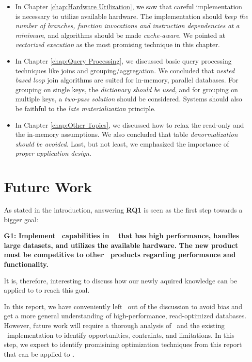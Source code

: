 \begin{itemize}
  \item In Chapter \ref{chap:Hardware Utilization}, we saw that careful implementation is necessary to utilize available hardware. The implementation should \textit{keep the number of branches, function invocations and instruction dependencies at a minimum}, and algorithms should be made \textit{cache-aware}. We pointed at \textit{vectorized execution} as the most promising technique in this chapter.

  \item In Chapter \ref{chap:Query Processing}, we discussed basic query processing techniques like joins and grouping/aggregation. We concluded that \textit{nested based loop} join algorithms are suited for in-memory, parallel databases. For grouping on single keys, the \textit{dictionary should be used}, and for grouping on multiple keys, a \textit{two-pass solution} should be considered. Systems should also be faithful to the \textit{late materialization} principle.

  \item In Chapter \ref{chap:Other Topics}, we discussed how to relax the read-only and the in-memory assumptions. We also concluded that table \textit{denormalization should be avoided}. Last, but not least, we emphasized the importance of \textit{proper application design}.
\end{itemize}


\section{Future Work}
\label{sec:Future Work}
As stated in the introduction, answering \textbf{RQ1} is seen as the first step towards a bigger goal:

\textbf{G1: Implement \bd~capabilities in \genusSoftware~ that has high performance, handles large datasets, and utilizes the available hardware. The new product must be competitive to other \bd~products regarding performance and functionality.}

It is, therefore, interesting to discuss how our newly aquired knowledge can be applied to to reach this goal.

In this report, we have conveniently left \genusSoftware~out of the discussion to avoid bias and get a more general understanding of high-performance, read-optimized databases. However, future work will require a thorough analysis of \genusSoftware~and the existing \bd~implementation to identify opportunities, contraints, and limitations. In this step, we expect to identify promisining optimization techniques from this report that can be applied to \genusSoftware.

